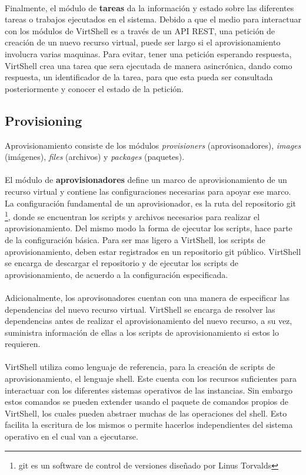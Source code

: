 \\
Finalmente, el módulo de \textbf{tareas} da la información y estado sobre las diferentes tareas o trabajos ejecutados en el sistema. Debido a que el medio para interactuar con los módulos de VirtShell es a través de un API REST, una petición de creación de un nuevo recurso virtual, puede ser largo si el aprovisionamiento involucra varias maquinas. Para evitar, tener una petición esperando respuesta, VirtShell crea una tarea que sera ejecutada de manera asincrónica, dando como respuesta, un identificador de la tarea, para que esta pueda ser consultada posteriormente y conocer el estado de la petición.


\subsection{Provisioning}
Aprovisionamiento consiste de los módulos \emph{provisioners} (aprovisonadores), \emph{images} (imágenes), \emph{files} (archivos) y \emph{packages} (paquetes).\\
\\
El módulo de \textbf{aprovisionadores} define un marco de aprovisionamiento de un recurso virtual y contiene las configuraciones necesarias para apoyar ese marco. La configuración fundamental de un aprovisionador, es la ruta del repositorio git \footnote{git es un software de control de versiones diseñado por Linus Torvalds}, donde se encuentran los scripts y archivos necesarios para realizar el aprovisionamiento. Del mismo modo la forma de ejecutar los scripts, hace parte de la configuración básica. Para ser mas ligero a VirtShell, los scripts de aprovisionamiento, deben estar registrados en un repositorio git público. VirtShell se encarga de descargar el repositorio y de ejecutar los scripts de aprovisionamiento, de acuerdo a la configuración especificada. \\
\\
Adicionalmente, los aprovisonadores cuentan con una manera de especificar las dependencias del nuevo recurso virtual. VirtShell se encarga de resolver las dependencias antes de realizar el aprovisionamiento del nuevo recurso, a su vez, suministra información de ellas a los scripts de aprovisionamiento si estos lo requieren. \\
\\
VirtShell utiliza como lenguaje de referencia, para la creación de scripts de aprovisionamiento, el lenguaje shell. Este cuenta con los recursos suficientes para interactuar con los diferentes sistemas operativos de las instancias. Sin embargo estos comandos se pueden extender usando el paquete de comandos propios de VirtShell, los cuales pueden abstraer muchas de las operaciones del shell. Esto facilita la escritura de los mismos o permite hacerlos independientes del sistema operativo en el cual van a ejecutarse.\\
